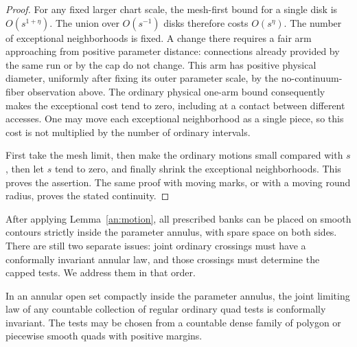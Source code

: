 \begin{proof}
For any fixed larger chart scale, the mesh-first bound for a single disk
is $O(s^{1+\eta})$.  The union over $O(s^{-1})$ disks therefore costs
$O(s^\eta)$.  The number of exceptional neighborhoods is fixed.  A change
there requires a fair arm approaching from positive parameter distance:
connections already provided by the same run or by the cap do not
change.  This arm has positive physical diameter, uniformly after fixing
its outer parameter scale, by the no-continuum-fiber observation above.
The ordinary physical one-arm bound consequently makes the exceptional
cost tend to zero, including at a contact between different accesses.
One may move each exceptional neighborhood as a single piece, so this
cost is not multiplied by the number of ordinary intervals.

First take the mesh limit, then make the ordinary motions small compared
with $s$, then let $s$ tend to zero, and finally shrink the exceptional
neighborhoods.  This proves the assertion.  The same proof with moving
marks, or with a moving round radius, proves the stated continuity.
\end{proof}

After applying Lemma~\ref{an:motion}, all prescribed banks can be placed
on smooth contours strictly inside the parameter annulus, with spare
space on both sides.  There are still two separate issues: joint ordinary
crossings must have a conformally invariant annular law, and those
crossings must determine the capped tests.  We address them in that order.

\begin{lemma}
\label{an:ordinary}
In an annular open set compactly inside the parameter annulus, the joint
limiting law of any countable collection of regular ordinary quad tests
is conformally invariant.  The tests may be chosen from a countable dense
family of polygon or piecewise smooth quads with positive margins.
\end{lemma}

